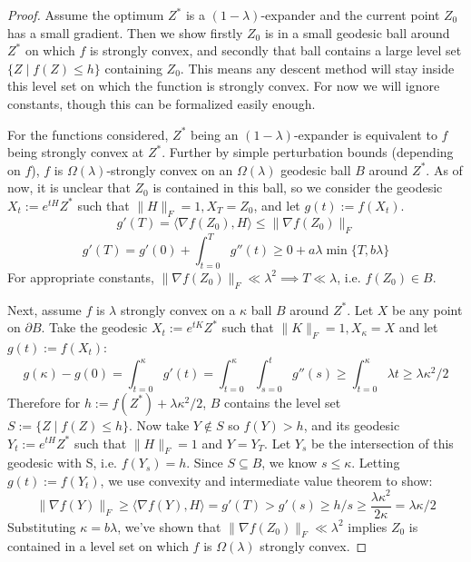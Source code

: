 \documentclass{article}
\begin{document}
\begin{proof}
Assume the optimum $Z^{*}$ is a $(1-\lambda)$-expander and the current point $Z_{0}$ has a small gradient. Then we show firstly $Z_{0}$ is in a small geodesic ball around $Z^{*}$ on which $f$ is strongly convex, and secondly that ball contains a large level set $\{Z \mid f(Z) \leq h \}$ containing $Z_{0}$. This means any descent method will stay inside this level set on which the function is strongly convex. For now we will ignore constants, though this can be formalized easily enough. 

For the functions considered, $Z^{*}$ being an $(1-\lambda)$-expander is equivalent to $f$ being strongly convex at $Z^{*}$. Further by simple perturbation bounds (depending on $f$), $f$ is $\Omega(\lambda)$-strongly convex on an $\Omega(\lambda)$ geodesic ball $B$ around $Z^{*}$. As of now, it is unclear that $Z_{0}$ is contained in this ball, so we consider the geodesic $X_{t} := e^{tH} Z^{*}$ such that $\|H\|_{F} = 1, X_{T} = Z_{0}$, and let $g(t) := f(X_{t})$. 
\[ g'(T) = \langle \nabla f(Z_{0}), H \rangle \leq \|\nabla f(Z_{0})\|_{F}   \]
\[ g'(T) = g'(0) + \int_{t=0}^{T} g''(t) \geq 0 + a \lambda \min\{T, b \lambda\}  \]
For appropriate constants, $\|\nabla f(Z_{0})\|_{F} \ll \lambda^{2} \implies T \ll \lambda$, i.e. $f(Z_{0}) \in B$. 


Next, assume $f$ is $\lambda$ strongly convex on a $\kappa$ ball $B$ around $Z^{*}$. Let $X$ be any point on $\partial B$. Take the geodesic $X_{t} := e^{tK} Z^{*}$ such that $\|K\|_{F}=1, X_{\kappa} = X$ and let $g(t) := f(X_{t})$:
\[ g(\kappa) - g(0) = \int_{t=0}^{\kappa} g'(t) = \int_{t=0}^{\kappa} \int_{s=0}^{t} g''(s) \geq \int_{t=0}^{\kappa} \lambda t \geq \lambda \kappa^{2}/2 \]
Therefore for $h := f(Z^{*}) + \lambda \kappa^{2}/2$, $B$ contains the level set $S := \{Z \mid f(Z) \leq h \}$. Now take $Y \not\in S$ so $f(Y) > h$, and its geodesic $Y_{t} := e^{tH} Z^{*}$ such that $\|H\|_{F}=1$ and $Y = Y_{T}$. Let $Y_{s}$ be the intersection of this geodesic with S, i.e. $f(Y_{s}) = h$. Since $S \subseteq B$, we know $s \leq \kappa$. Letting $g(t) := f(Y_{t})$, we use convexity and intermediate value theorem to show:
\[ \|\nabla f(Y)\|_{F} \geq \langle \nabla f(Y), H \rangle = g'(T) > g'(s) \geq h / s \geq  \frac{\lambda \kappa^{2}}{2 \kappa} = \lambda \kappa / 2  \]
Substituting $\kappa = b\lambda$, we've shown that $\|\nabla f(Z_{0})\|_{F} \ll \lambda^{2}$ implies $Z_{0}$ is contained in a level set on which $f$ is $\Omega(\lambda)$ strongly convex. 


\end{proof}
\end{document}

